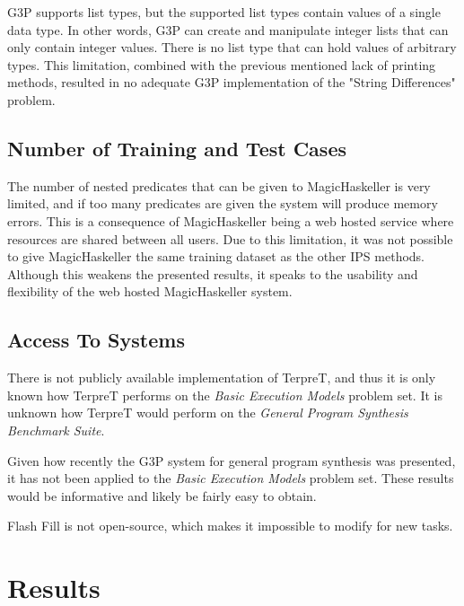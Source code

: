 G3P supports list types, but the supported list types contain values of a single data type. In other words, G3P can create and manipulate integer lists that can only contain integer values. There is no list type that can hold values of arbitrary types. This limitation, combined with the previous mentioned lack of printing methods, resulted in no adequate G3P implementation of the "String Differences" problem.

\subsection{Number of Training and Test Cases}

The number of nested predicates that can be given to MagicHaskeller is very limited, and if too many predicates are given the system will produce memory errors. This is a consequence of MagicHaskeller being a web hosted service where resources are shared between all users. Due to this limitation, it was not possible to give MagicHaskeller the same training dataset as the other IPS methods. Although this weakens the presented results, it speaks to the usability and flexibility of the web hosted MagicHaskeller system.

\subsection{Access To Systems}

There is not publicly available implementation of TerpreT, and thus it is only known how TerpreT performs on the \emph{Basic Execution Models} problem set. It is unknown how TerpreT would perform on the \emph{General Program Synthesis Benchmark Suite}.

Given how recently the G3P system for general program synthesis was presented, it has not been applied to the \emph{Basic Execution Models} problem set. These results would be informative and likely be fairly easy to obtain.

Flash Fill is not open-source, which makes it impossible to modify for new tasks.

\section{Results}

